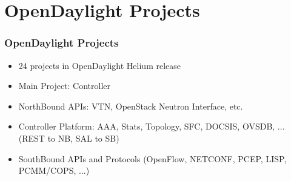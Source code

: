 \section{OpenDaylight Projects}

\begin{frame}[allowframebreaks]
\frametitle{OpenDaylight Projects}


\begin{itemize}
 \item 24 projects in OpenDaylight Helium release
 \item Main Project: Controller
 \item NorthBound APIs: VTN, OpenStack Neutron Interface, etc.
 \item Controller Platform: AAA, Stats, Topology, SFC, DOCSIS, OVSDB, ... (REST to NB, SAL to SB)
 \item SouthBound APIs and Protocols (OpenFlow, NETCONF, PCEP, LISP, PCMM/COPS, ...)
\end{itemize}

\end{frame}
